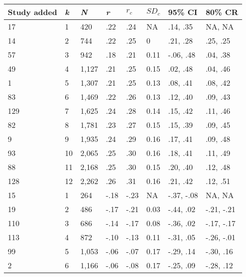 \begin{table}[ht]
\centering
\begin{tabular}{llllllll}
  \hline
Study added & \textit{k} & \textit{N} & \textit{r} & \textit{$r_c$} & \textit{$SD_c$} & 95\% CI & 80\% CR \\ 
  \hline
17 & 1 & 420 & .22 & .24 &  NA & .14, .35 &  NA,  NA \\ 
  14 & 2 & 744 & .22 & .25 & 0 & .21, .28 & .25, .25 \\ 
  57 & 3 & 942 & .18 & .21 & 0.11 & -.06, .48 & .04, .38 \\ 
  49 & 4 & 1,127 & .21 & .25 & 0.15 & .02, .48 & .04, .46 \\ 
  1 & 5 & 1,307 & .21 & .25 & 0.13 & .08, .41 & .08, .42 \\ 
  83 & 6 & 1,469 & .22 & .26 & 0.13 & .12, .40 & .09, .43 \\ 
  129 & 7 & 1,625 & .24 & .28 & 0.14 & .15, .42 & .11, .46 \\ 
  82 & 8 & 1,781 & .23 & .27 & 0.15 & .15, .39 & .09, .45 \\ 
  9 & 9 & 1,935 & .24 & .29 & 0.16 & .17, .41 & .09, .48 \\ 
  93 & 10 & 2,065 & .25 & .30 & 0.16 & .18, .41 & .11, .49 \\ 
  88 & 11 & 2,168 & .25 & .30 & 0.15 & .20, .40 & .12, .48 \\ 
  128 & 12 & 2,262 & .26 & .31 & 0.16 & .21, .42 & .12, .51 \\ 
  15 & 1 & 264 & -.18 & -.23 &  NA & -.37, -.08 &  NA,  NA \\ 
  19 & 2 & 486 & -.17 & -.21 & 0.03 & -.44, .02 & -.21, -.21 \\ 
  110 & 3 & 686 & -.14 & -.17 & 0.08 & -.36, .02 & -.17, -.17 \\ 
  113 & 4 & 872 & -.10 & -.13 & 0.11 & -.31, .05 & -.26, -.01 \\ 
  99 & 5 & 1,053 & -.06 & -.07 & 0.17 & -.29, .14 & -.30, .16 \\ 
  2 & 6 & 1,166 & -.06 & -.08 & 0.17 & -.25, .09 & -.28, .12 \\ 
   \hline
\end{tabular}
\end{table}
